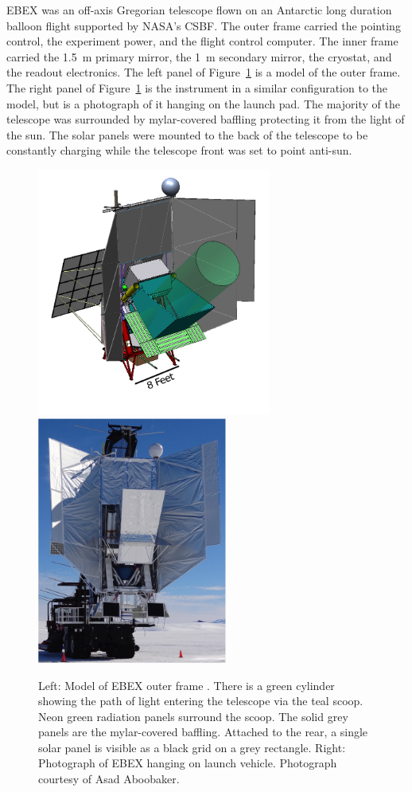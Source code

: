 \ac{EBEX} was an off-axis Gregorian
 telescope flown on an Antarctic long duration balloon flight supported by \ac{NASA}'s \ac{CSBF}. 
The outer frame carried the pointing control, the experiment power, and the flight control computer. 
The inner frame carried the 1.5~m primary mirror, the 1~m secondary mirror, the cryostat, and the readout electronics. 
The left panel of Figure~\ref{fig:outer_frame} is a model of the outer frame. 
The right panel of Figure~\ref{fig:outer_frame} is the instrument in a similar configuration to the model, but is a photograph of it hanging on the launch pad. 
The majority of the telescope was surrounded by mylar-covered baffling protecting it from the light of the sun. 
The solar panels were mounted to the back of the telescope to be constantly charging while the telescope front was set to point anti-sun. 

\begin{figure}[htbp]
\begin{center}
\includegraphics[height=3.2in]{figures/ebex_model.png}
\includegraphics[height=3.2in]{figures/ebex_hanging.png}
\caption[Outer frame, model and photograph]{Left: Model of \ac{EBEX} outer frame \cite{Zilic2014}. There is a green cylinder showing the path of light entering the telescope via the teal scoop. Neon green radiation panels surround the scoop. The solid grey panels are the mylar-covered baffling. Attached to the rear, a single solar panel is visible as a black grid on a grey rectangle. Right: Photograph of \ac{EBEX} hanging on launch vehicle. Photograph courtesy of Asad Aboobaker. 
\label{fig:outer_frame} }
\end{center}
\end{figure}

